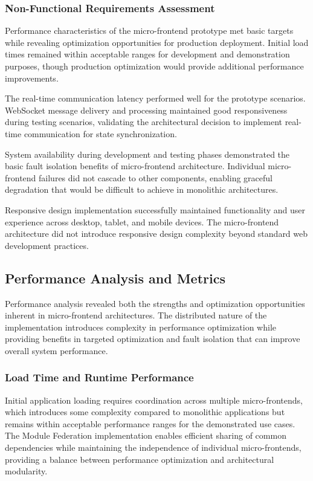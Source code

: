 \documentclass[12pt,a4paper]{report}
\begin{document}
\subsubsection{Non-Functional Requirements Assessment}

Performance characteristics of the micro-frontend prototype met basic targets while revealing optimization opportunities for production deployment. Initial load times remained within acceptable ranges for development and demonstration purposes, though production optimization would provide additional performance improvements.

The real-time communication latency performed well for the prototype scenarios. WebSocket message delivery and processing maintained good responsiveness during testing scenarios, validating the architectural decision to implement real-time communication for state synchronization.

System availability during development and testing phases demonstrated the basic fault isolation benefits of micro-frontend architecture. Individual micro-frontend failures did not cascade to other components, enabling graceful degradation that would be difficult to achieve in monolithic architectures.

Responsive design implementation successfully maintained functionality and user experience across desktop, tablet, and mobile devices. The micro-frontend architecture did not introduce responsive design complexity beyond standard web development practices.

\subsection{Performance Analysis and Metrics}

Performance analysis revealed both the strengths and optimization opportunities inherent in micro-frontend architectures. The distributed nature of the implementation introduces complexity in performance optimization while providing benefits in targeted optimization and fault isolation that can improve overall system performance.

\subsubsection{Load Time and Runtime Performance}

Initial application loading requires coordination across multiple micro-frontends, which introduces some complexity compared to monolithic applications but remains within acceptable performance ranges for the demonstrated use cases. The Module Federation implementation enables efficient sharing of common dependencies while maintaining the independence of individual micro-frontends, providing a balance between performance optimization and architectural modularity.
\end{document}
